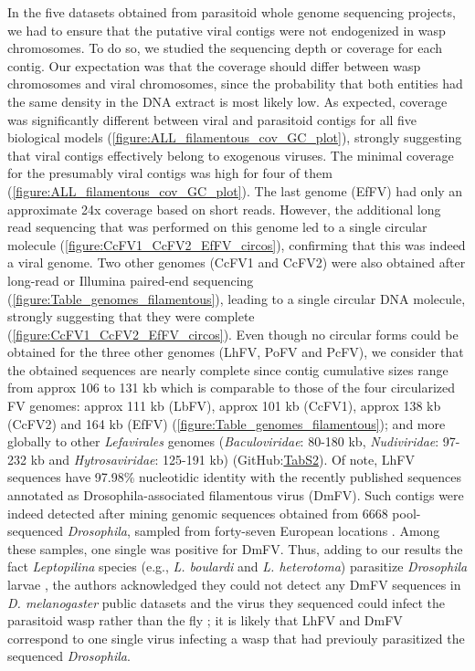 In the five datasets obtained from parasitoid whole genome sequencing projects, we had to ensure that the putative viral contigs were not endogenized in wasp chromosomes. To do so, we studied the sequencing depth or coverage for each contig. Our expectation was that the coverage should differ between wasp chromosomes and viral chromosomes, since the probability that both entities had the same density in the DNA extract is most likely low. As expected, coverage was significantly different between viral and parasitoid contigs for all five biological models (\figurename{\ref{figure:ALL_filamentous_cov_GC_plot}}), strongly suggesting that viral contigs effectively belong to exogenous viruses. The minimal coverage for the presumably viral contigs was high for four of them (\figurename{\ref{figure:ALL_filamentous_cov_GC_plot}}). The last genome (EfFV) had only an approximate 24x coverage based on short reads. However, the additional long read sequencing that was performed on this genome led to a single circular molecule (\figurename{\ref{figure:CcFV1_CcFV2_EfFV_circos}}), confirming that this was indeed a viral genome. Two other genomes (CcFV1 and CcFV2) were also obtained after long-read or Illumina paired-end sequencing (\figurename{\ref{figure:Table_genomes_filamentous}}), leading to a single circular DNA molecule, strongly suggesting that they were complete (\figurename{\ref{figure:CcFV1_CcFV2_EfFV_circos}}). Even though no circular forms could be obtained for the three other genomes (LhFV, PoFV and PcFV), we consider that the obtained sequences are nearly complete since contig cumulative sizes range from approx 106 to 131 kb which is comparable to those of the four circularized FV genomes: approx 111 kb (LbFV), approx 101 kb (CcFV1), approx 138 kb (CcFV2) and 164 kb (EfFV) (\figurename{\ref{figure:Table_genomes_filamentous}}); and more globally to other \textit{Lefavirales} genomes (\textit{Baculoviridae}: 80-180 kb, \textit{Nudiviridae}: 97-232 kb and \textit{Hytrosaviridae}: 125-191 kb) (GitHub:\href{https://github.com/BenjaminGuinet/PhD_defense/blob/main/Supplementary_paper2/Table%20S2.xlsx}{TabS2}). Of note, LhFV sequences have 97.98\% nucleotidic identity with the recently published sequences annotated as Drosophila-associated filamentous virus (DmFV). Such contigs were indeed detected after mining genomic sequences obtained from 6668 pool-sequenced \textit{Drosophila}, sampled from forty-seven European locations \citep{wallace_discovery_2021}. Among these samples, one single was positive for DmFV. Thus, adding to our results the fact \textit{Leptopilina} species (e.g., \textit{L. boulardi} and \textit{L. heterotoma}) parasitize \textit{Drosophila} larvae \citep{kopelman_immature_1984,schlenke_contrasting_2007}, the authors acknowledged they could not detect any DmFV sequences in \textit{D. melanogaster} public datasets and the virus they sequenced could infect the parasitoid wasp rather than the fly \citep{wallace_discovery_2021}; it is likely that LhFV and DmFV correspond to one single virus infecting a wasp that had previouly parasitized the sequenced \textit{Drosophila}.  

